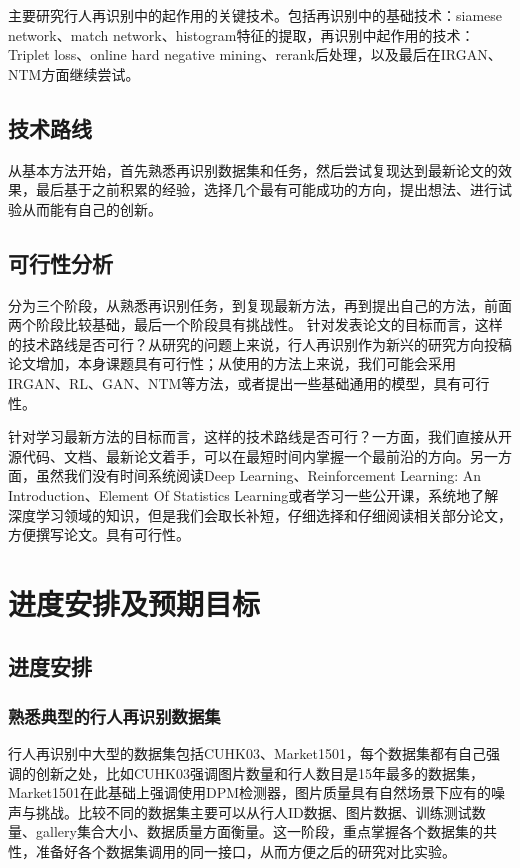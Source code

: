 主要研究行人再识别中的起作用的关键技术。包括再识别中的基础技术：siamese network、match network、histogram特征的提取，再识别中起作用的技术：Triplet loss、online hard negative mining、rerank后处理，以及最后在IRGAN、NTM方面继续尝试。

\subsection{技术路线}

从基本方法开始，首先熟悉再识别数据集和任务，然后尝试复现达到最新论文的效果，最后基于之前积累的经验，选择几个最有可能成功的方向，提出想法、进行试验从而能有自己的创新。

\subsection{可行性分析}

分为三个阶段，从熟悉再识别任务，到复现最新方法，再到提出自己的方法，前面两个阶段比较基础，最后一个阶段具有挑战性。
针对发表论文的目标而言，这样的技术路线是否可行？从研究的问题上来说，行人再识别作为新兴的研究方向投稿论文增加，本身课题具有可行性；从使用的方法上来说，我们可能会采用IRGAN、RL、GAN、NTM等方法，或者提出一些基础通用的模型，具有可行性。

针对学习最新方法的目标而言，这样的技术路线是否可行？一方面，我们直接从开源代码、文档、最新论文着手，可以在最短时间内掌握一个最前沿的方向。另一方面，虽然我们没有时间系统阅读Deep Learning、Reinforcement Learning: An Introduction、Element Of Statistics Learning或者学习一些公开课，系统地了解深度学习领域的知识，但是我们会取长补短，仔细选择和仔细阅读相关部分论文，方便撰写论文。具有可行性。

\section{进度安排及预期目标}

\subsection{进度安排} 

\subsubsection{熟悉典型的行人再识别数据集} 

行人再识别中大型的数据集包括CUHK03、Market1501，每个数据集都有自己强调的创新之处，比如CUHK03强调图片数量和行人数目是15年最多的数据集，Market1501在此基础上强调使用DPM检测器，图片质量具有自然场景下应有的噪声与挑战。比较不同的数据集主要可以从行人ID数据、图片数据、训练测试数量、gallery集合大小、数据质量方面衡量。这一阶段，重点掌握各个数据集的共性，准备好各个数据集调用的同一接口，从而方便之后的研究对比实验。

